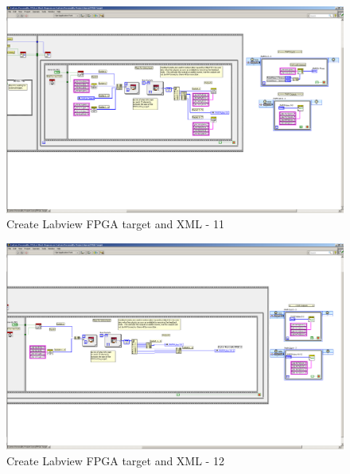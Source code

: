 \begin{figure}[htb!]
	\centering \includegraphics[angle=-90,scale=0.45]{Screenshots/Screenshot_2015-01-16_19-29-04.png}
	\caption{Create Labview FPGA target and XML - 11}
	\label{fig: Create Labview FPGA target and XML-11} 
\end{figure}
\begin{figure}[htb!]
	\centering \includegraphics[angle=-90,scale=0.45]{Screenshots/Screenshot_2015-01-16_20-07-43.png}
	\caption{Create Labview FPGA target and XML - 12}
	\label{fig: Create Labview FPGA target and XML-12} 
\end{figure}
